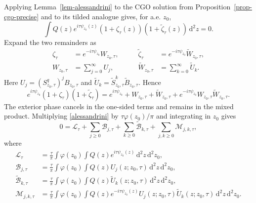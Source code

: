 \documentclass[a4paper,11pt]{article}
\newcommand{\psiz}{\psi_{z_0}}
\newcommand{\dd}{\,\text{d}}
\theoremstyle{plain}
\theoremstyle{definition}
\theoremstyle{remark}
\begin{document}
Applying Lemma~\ref{lem-alessandrini} to the CGO solution from Proposition~\ref{prop-cgo-precise} and to its tilded analogue gives, for a.e. $z_0$,
\begin{equation}\label{alessandrini}
\int Q(z) e^{i\tau\psiz(z)}(1+\zeta_\tau(z))(1+\widetilde\zeta_\tau(z))\dd^2 z=0.
\end{equation}
Expand the two remainders as
\begin{equation}\label{remainder-neumann-expansion}
\begin{aligned}
        \zeta_\tau&=e^{-i\tau\psi_{z_0}}W_{z_0,\tau},
        &\qquad
        \widetilde\zeta_\tau&=e^{-i\tau\psi_{z_0}}\widetilde W_{z_0,\tau},\\
        W_{z_0,\tau}&=\sum_{j=0}^\infty U_j,
        &\qquad
        \widetilde W_{z_0,\tau}&=\sum_{k=0}^\infty \widetilde U_k .
\end{aligned}
\end{equation}
Here $U_j=(S^q_{z_0,\tau})^jB_{z_0,\tau}$ and $\widetilde U_k=\widetilde S_{z_0,\tau}^k\widetilde B_{z_0,\tau}$.  Hence
\begin{equation}\label{pointwise-born-decomposition}
 e^{i\tau\psi_{z_0}}(1+\zeta_\tau)(1+\widetilde\zeta_\tau)
 = e^{i\tau\psi_{z_0}}
   +W_{z_0,\tau}+\widetilde W_{z_0,\tau}
   +e^{-i\tau\psi_{z_0}}W_{z_0,\tau}\widetilde W_{z_0,\tau}.
\end{equation}
The exterior phase cancels in the one-sided terms and remains in the mixed product.  Multiplying \eqref{alessandrini} by $\tau\varphi(z_0)/\pi$ and integrating in $z_0$ gives
\begin{equation}\label{averaged-born-decomposition}
0=\mathcal L_\tau
  +\sum_{j\ge0}\mathcal B_{j,\tau}
  +\sum_{k\ge0}\widetilde{\mathcal B}_{k,\tau}
  +\sum_{j,k\ge0}\mathcal M_{j,k,\tau},
\end{equation}
where
\begin{align}
\mathcal L_\tau
&=\frac{\tau}{\pi}\int\varphi(z_0)
  \int Q(z)e^{i\tau\psi_{z_0}(z)}\dd^2z\dd^2z_0, \label{leading-functional-def}\\
\mathcal B_{j,\tau}
&=\frac{\tau}{\pi}\int\varphi(z_0)
  \int Q(z)U_j(z;z_0,\tau)\dd^2z\dd^2z_0,
  \label{left-born-functional-def}\\
\widetilde{\mathcal B}_{k,\tau}
&=\frac{\tau}{\pi}\int\varphi(z_0)
  \int Q(z)\widetilde U_k(z;z_0,\tau)\dd^2z\dd^2z_0,
  \label{right-born-functional-def}\\
\mathcal M_{j,k,\tau}
&=\frac{\tau}{\pi}\int\varphi(z_0)
  \int Q(z)e^{-i\tau\psi_{z_0}(z)}
  U_j(z;z_0,\tau)\widetilde U_k(z;z_0,\tau)\dd^2z\dd^2z_0.
  \label{mixed-born-functional-def}
\end{align}
\end{document}
